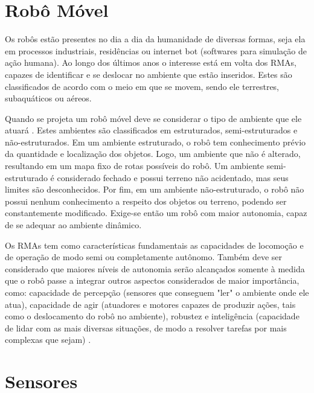 
\section{Robô Móvel}
\label{sec:robomovel}

Os robôs estão presentes no dia a dia da humanidade de diversas formas, seja ela em processos industriais, residências ou internet bot (softwares para simulação de ação humana). Ao longo dos últimos anos o interesse está em volta dos RMAs, capazes de identificar e se deslocar no ambiente que estão inseridos. Estes são classificados de acordo com o meio em que se movem, sendo ele terrestres, subaquáticos ou aéreos.

Quando se projeta um robô móvel deve se considerar o tipo de ambiente que ele atuará \cite{rogeralex1999}. Estes ambientes são classificados em estruturados, semi-estruturados e não-estruturados. Em um ambiente estruturado, o robô tem conhecimento prévio da quantidade e localização dos objetos. Logo, um ambiente que não é alterado, resultando em um mapa fixo de rotas possíveis do robô. Um ambiente semi-estruturado é considerado fechado e possui terreno não acidentado, mas seus limites são desconhecidos. Por fim, em um ambiente não-estruturado, o robô não possui nenhum conhecimento a respeito dos objetos ou terreno, podendo ser constantemente modificado. Exige-se então um robô com maior autonomia, capaz de se adequar ao ambiente dinâmico.

Os RMAs tem como características fundamentais as capacidades de locomoção e de operação de modo semi ou completamente autônomo. Também deve ser considerado que maiores níveis de autonomia serão alcançados somente à medida que o robô passe a integrar outros aspectos considerados de maior importância, como: capacidade de percepção (sensores que conseguem "ler" o ambiente onde ele atua), capacidade de agir (atuadores e motores capazes de produzir ações, tais como o deslocamento do robô no ambiente), robustez e inteligência (capacidade de lidar com as mais diversas situações, de modo a resolver tarefas por mais complexas que sejam) \cite{wolf2009robotica}.

\section{Sensores}
\label{sec:sensores}

